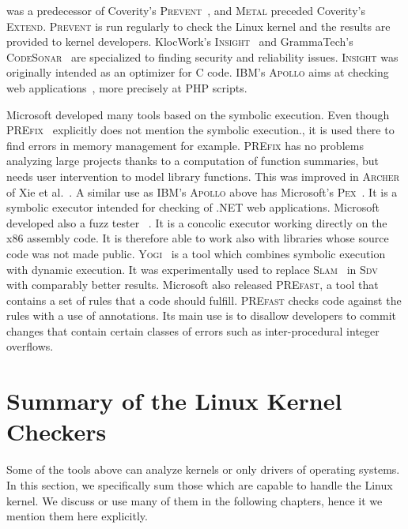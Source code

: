 \xgcc was a predecessor of Coverity's \textsc{Prevent}~\cite{coverity}, and
\textsc{Metal} preceded Coverity's \textsc{Extend}. \textsc{Prevent} is run
regularly to check the Linux kernel and the results are provided to kernel
developers.  KlocWork's \textsc{Insight}~\cite{klocwork} and GrammaTech's
\textsc{CodeSonar}~\cite{codesonar} are specialized to finding security and
reliability issues. \textsc{Insight} was originally intended as an optimizer
for C code. IBM's \textsc{Apollo} aims at checking web
applications~\cite{apollo}, more precisely at \textsc{PHP} scripts.

Microsoft developed many tools based on the symbolic execution.  Even though
\textsc{PREfix}~\cite{prefix} explicitly does not mention the symbolic
execution., it is used there to find errors in memory management for example.
\textsc{PREfix} has no problems analyzing large projects thanks to a
computation of function summaries, but needs user intervention to model
library functions.  This was improved in \textsc{Archer} of Xie et
al.~\cite{archer}. A similar use as IBM's \textsc{Apollo} above has
Microsoft's \textsc{Pex}~\cite{pex}. It is a symbolic executor intended for
checking of .NET web applications. Microsoft developed also a fuzz tester
\sage~\cite{sage}.  It is a concolic executor working directly on the x86
assembly code. It is therefore able to work also with libraries whose source
code was not made public.  \textsc{Yogi}~\cite{yogi} is a tool which combines
symbolic execution with dynamic execution. It was experimentally used to
replace \textsc{Slam}~\cite{slam_decade} in \textsc{Sdv}~\cite{sdv} with
comparably better results. Microsoft also released \textsc{PREfast}, a tool
that contains a set of rules that a code should fulfill. \textsc{PREfast}
checks code against the rules with a use of annotations. Its main use is to
disallow developers to commit changes that contain certain classes of errors
such as inter-procedural integer overflows.


\section{Summary of the Linux Kernel Checkers}
Some of the tools above can analyze kernels or only drivers of operating
systems. In this section, we specifically sum those which are capable to
handle the Linux kernel. We discuss or use many of them in the following
chapters, hence it we mention them here explicitly.

